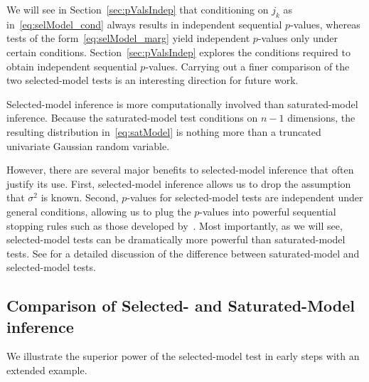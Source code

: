 \documentclass{article}
\begin{document}
We will see in Section~\ref{sec:pValsIndep} that conditioning on $j_k$ as in~\eqref{eq:selModel_cond} always results in independent sequential $p$-values, whereas tests of the form~\eqref{eq:selModel_marg} yield independent $p$-values only under certain conditions. Section~\ref{sec:pValsIndep} explores the conditions required to obtain independent sequential $p$-values. Carrying out a finer comparison of the two selected-model tests is an interesting direction for future work.

Selected-model inference is more computationally involved than saturated-model inference. Because the saturated-model test conditions on $n-1$ dimensions, the resulting distribution in~\eqref{eq:satModel} is nothing more than a truncated univariate Gaussian random variable.

However, there are several major benefits to selected-model inference that often justify its use. First, selected-model inference allows us to drop the assumption that $\sigma^2$ is known. Second, $p$-values for selected-model tests are independent under general conditions, allowing us to plug the $p$-values into powerful sequential stopping rules such as those developed by~\citet{gsell2013sequential}. Most importantly, as we will see, selected-model tests can be dramatically more powerful than saturated-model tests. See \citet[][Section 5]{fithian2014optimal} for a detailed discussion of the difference between saturated-model and selected-model tests.


\subsection{Comparison of Selected- and Saturated-Model inference}\label{sec:bivariate}

We illustrate the superior power of the selected-model test in early steps with an extended example.
\end{document}
